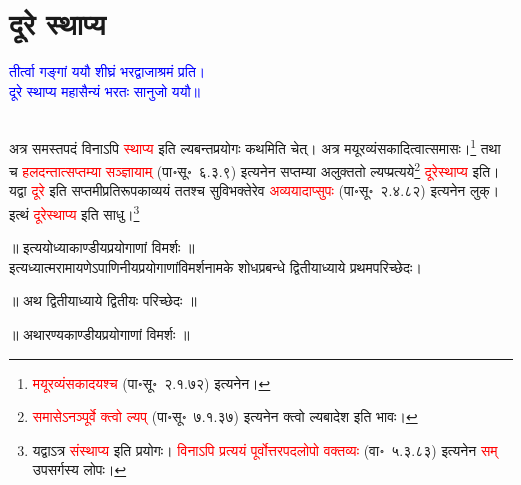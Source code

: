 \section[दूरे स्थाप्य]{दूरे स्थाप्य}
\centering\textcolor{blue}{तीर्त्वा गङ्गां ययौ शीघ्रं भरद्वाजाश्रमं प्रति।\nopagebreak\\
दूरे स्थाप्य महासैन्यं भरतः सानुजो ययौ॥}\nopagebreak\\
\\
\begin{sloppypar}\justifying\noindent\hspace{10mm} अत्र समस्त\-पदं विनाऽपि \textcolor{red}{स्थाप्य} इति ल्यबन्त\-प्रयोगः कथमिति चेत्। अत्र मयूर\-व्यंसकादित्वात्समासः।\footnote{\textcolor{red}{मयूरव्यंसकादयश्च} (पा॰सू॰~२.१.७२) इत्यनेन।} तथा च \textcolor{red}{हलदन्तात्सप्तम्या सञ्ज्ञायाम्} (पा॰सू॰~६.३.९) इत्यनेन सप्तम्या अलुक्ततो ल्यप्प्रत्यये\footnote{\textcolor{red}{समासेऽनञ्पूर्वे क्त्वो ल्यप्‌} (पा॰सू॰~७.१.३७) इत्यनेन क्त्वो ल्यबादेश इति भावः।} \textcolor{red}{दूरेस्थाप्य} इति। यद्वा \textcolor{red}{दूरे} इति सप्तमी\-प्रतिरूपकाव्ययं ततश्च सुविभक्तेरेव \textcolor{red}{अव्ययादाप्सुपः} (पा॰सू॰~२.४.८२) इत्यनेन लुक्। इत्थं \textcolor{red}{दूरेस्थाप्य} इति साधु।\footnote{यद्वाऽत्र \textcolor{red}{संस्थाप्य} इति प्रयोगः। \textcolor{red}{विनाऽपि प्रत्ययं पूर्वोत्तर\-पद\-लोपो वक्तव्यः} (वा॰~५.३.८३) इत्यनेन \textcolor{red}{सम्} उपसर्गस्य लोपः।}\end{sloppypar}
\vspace{2mm}
\centering ॥ इत्ययोध्याकाण्डीयप्रयोगाणां विमर्शः ॥\nopagebreak\\
\vspace{4mm}
\centering इत्यध्यात्म\-रामायणेऽपाणिनीय\-प्रयोगाणां\-विमर्श\-नामके शोध\-प्रबन्धे द्वितीयाध्याये प्रथम\-परिच्छेदः।\\
\pagebreak
{}
{}
\centering ॥ अथ द्वितीयाध्याये द्वितीयः परिच्छेदः ॥\nopagebreak\\
\vspace{4mm}
{}
\centering ॥ अथारण्यकाण्डीयप्रयोगाणां विमर्शः ॥\nopagebreak\\
